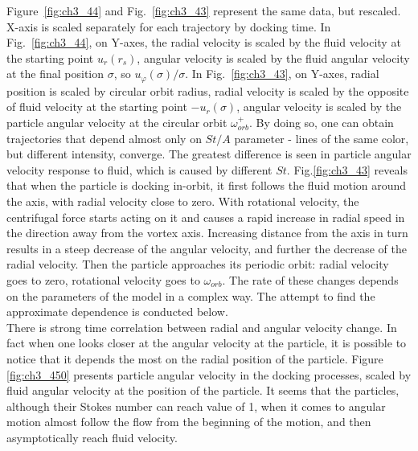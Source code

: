 \documentclass[../main.tex]{subfiles}
\begin{document}
Figure~\ref{fig:ch3_44} and Fig.~\ref{fig:ch3_43} represent the same data, but rescaled. X-axis is scaled separately for each trajectory by docking time. In Fig.~\ref{fig:ch3_44}, on Y-axes, the radial velocity is scaled by the fluid velocity at the starting point $u_r(r_s)$, angular velocity is scaled by the fluid angular velocity at the final position $\sigma$, so $u_{\varphi}(\sigma)/\sigma$. In Fig.~\ref{fig:ch3_43},
on Y-axes, radial position is scaled by circular orbit radius, radial velocity is scaled by the opposite of fluid velocity at the starting point $-u_r(\sigma)$, angular velocity is scaled by the particle angular velocity at the circular orbit $\omega^+_{orb}$. By doing so, one can obtain trajectories that depend almost only on $St/A$ parameter - lines of the same color, but different intensity, converge. The greatest difference is seen in particle angular velocity response to fluid, which is caused by different $St$. Fig.\ref{fig:ch3_43} reveals that when the particle is docking in-orbit, it first follows the fluid motion around the axis, with radial velocity close to zero. With rotational velocity, the centrifugal force starts acting on it and causes a rapid increase in radial speed in the direction away from the vortex axis. Increasing distance from the axis in turn results in a steep decrease of the angular velocity, and further the decrease of the radial velocity. Then the particle approaches its periodic orbit: radial velocity goes to zero, rotational velocity goes to $\omega_{orb}$. The rate of these changes depends on the parameters of the model in a complex way. The attempt to find the approximate dependence is conducted below.\\
There is strong time correlation between radial and angular velocity change. In fact when one looks closer at the angular velocity at the particle, it is possible to notice that it depends the most on the radial position of the particle. Figure \ref{fig:ch3_450} presents particle angular velocity in the docking processes, scaled by fluid angular velocity at the position of the particle. It seems that the particles, although their Stokes number can reach value of 1, when it comes to angular motion almost follow the flow from the beginning of the motion, and then asymptotically reach fluid velocity.
\end{document}
